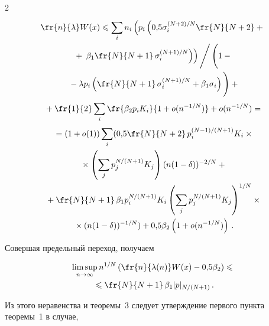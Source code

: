\begin{multicols}{2}
\begin{multline*}
\fr{n}{\lambda} W(x)\leqslant \suml{i}{}n_i


\left (p_i\left ( 0{,}5 \sigma_i^{(N+2)/N}\fr{N}{N+2}+{}\right.\right.\\


{}+\left.\left.\beta_1 \fr{N}{N+1}\,\sigma_i^{(N+1)/N}\right )\right )\Bigg / \left (\vphantom{\Bigg /}


1 -{}\right.\\


\left.{}-\lambda p_i\left ( \fr{N}{N+1}\,


\sigma_i^{(N+1)/N}+\beta_1\sigma_i\right )


\vphantom{\Bigg /}\right )+{}\\


{}+\fr{1}{2}\suml{i}{}\fr{\beta_2 p_i K_i}{1+o(n^{-1/N})} + o(n^{-1/N})={}   \\


{}=(1+o(1))\suml{i}{}(0{,}5 \fr{N}{N+2}\,p_i^{(N-1)/(N+1)}K_i\times{}\\


{}\times \left(\suml{j}{}p_j^{N/(N+1)}K_j\right)(n(1-\delta))^{-2/N}+{}\\


{}+ \fr{N}{N+1}\,\beta_1 p_i^{N/(N+1)} K_i \left(\suml{j}{}p_j^{N/(N+1)} K_j\right)^{1/N}\times{}\\


{}\times


(n(1-\delta))^{-1/N} )+ 0{,}5\beta_2\left ( 1+o(n^{-1/N})\right )\,.


\end{multline*}





Совершая предельный переход, получаем


\begin{multline*}


\lims{n\rightarrow


\infty}n^{1/N}\left(\fr{n}{\lambda(n)}W(x)-0{,}5\beta_2\right)\leqslant{}\\


{}\leqslant


\fr{N}{N+1}\, \beta_1 |p|_{N/(N+1)}\,.


\end{multline*}





Из этого неравенства и теоремы~3 следует утверждение первого пункта теоремы~1 в случае,



\end{multicols}
